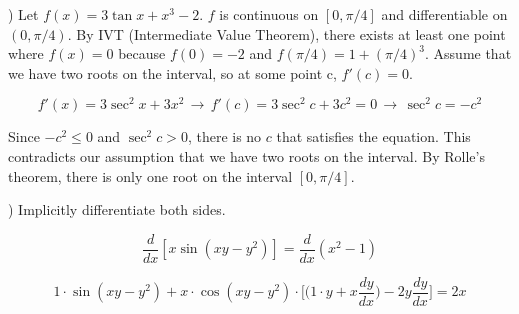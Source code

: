 \documentclass{article}
\begin{document}
\begin{center}
\end{center}

\hfill

) Let $f(x) = 3\tan x + x^3 -2$. $f$ is continuous on $[0, \pi/4]$ and differentiable on $(0, \pi/4)$. By IVT (Intermediate Value Theorem), there exists at least one point where $f(x) = 0$ because $f(0) = -2$ and $f(\pi/4) = 1 + (\pi/4)^3$. Assume that we have two roots on the interval, so at some point c, $f'(c) = 0$.

\begin{equation*}f'(x) = 3\sec^2x + 3x^2\,\rightarrow\, f'(c) = 3\sec^2c + 3c^2 = 0\,\rightarrow\,\sec^2c =-c^2 \end{equation*}

\hfill

\noindent Since $-c^2 \leq 0$ and $\sec ^2c > 0$, there is no $c$ that satisfies the equation. This contradicts our assumption that we have two roots on the interval. By Rolle's theorem, there is only one root on the interval $[0, \pi/4]$.

\hfill

) Implicitly differentiate both sides.

\begin{equation*}\frac{d}{dx}[x \sin(xy-y^2)] = \frac{d}{dx}(x^2-1) \end{equation*}

\begin{equation*}1\cdot \sin(xy-y^2) + x\cdot\cos(xy-y^2) \cdot \Big[\Big(1\cdot y + x\frac{dy}{dx} \Big) -2y\frac{dy}{dx}\Big]= 2x\end{equation*}

\hfill
\end{document}
